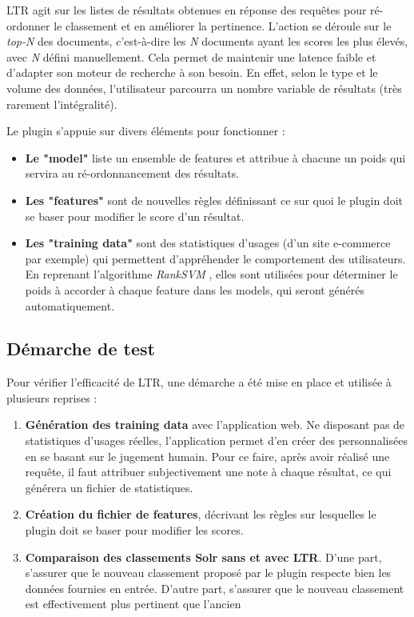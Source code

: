 \documentclass[twocolumn,a4paper]{IEEEtranfr}
\begin{document}
LTR agit sur les listes de résultats obtenues en réponse des requêtes pour ré-ordonner le classement et en améliorer la pertinence. L'action se déroule sur le \textit{top-N} des documents, c'est-à-dire les \textit{N} documents ayant les scores les plus élevés, avec \textit{N} défini manuellement. Cela permet de maintenir une latence faible et d'adapter son moteur de recherche à son besoin. En effet, selon le type et le volume des données, l'utilisateur parcourra un nombre variable de résultats (très rarement l'intégralité).

Le plugin s'appuie sur divers éléments pour fonctionner : 
\begin{itemize}
  \item \textbf{Le "model"} liste un ensemble de features et attribue à chacune un poids qui servira au ré-ordonnancement des résultats.
  \item \textbf{Les "features"} sont de nouvelles règles définissant ce sur quoi le plugin doit se baser pour modifier le score d'un résultat.
  \item \textbf{Les "training data"} sont des statistiques d'usages (d'un site e-commerce par exemple) qui permettent d'appréhender le comportement des utilisateurs. En reprenant l'algorithme \textit{RankSVM} \cite{rankSVM}, elles sont utilisées pour déterminer le poids à accorder à chaque feature dans les models, qui seront générés automatiquement.
\end{itemize}


\subsection{Démarche de test}

Pour vérifier l'efficacité de LTR, une démarche a été mise en place et utilisée à plusieurs reprises :
\begin{enumerate}
  \item \textbf{Génération des training data} avec l'application web. Ne disposant pas de statistiques d'usages réelles, l'application permet d'en créer des personnalisées en se basant sur le jugement humain. Pour ce faire, après avoir réalisé une requête, il faut attribuer subjectivement une note à chaque résultat, ce qui générera un fichier de statistiques.
  \item \textbf{Création du fichier de features}, décrivant les règles sur lesquelles le plugin doit se baser pour modifier les scores.
   \item \textbf{Comparaison des classements Solr sans et avec LTR}. D'une part, s'assurer que le nouveau classement proposé par le plugin respecte bien les données fournies en entrée. D'autre part, s'assurer que le nouveau classement est effectivement plus pertinent que l'ancien 
\end{enumerate}
\end{document}
